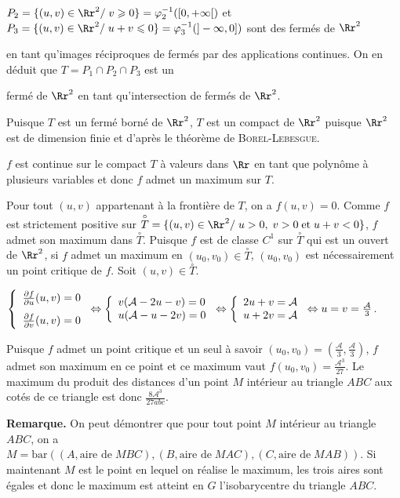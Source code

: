 {{$P_2=\{(u,v)\in\Rr^2/\;v\geqslant0\}=\varphi_2^{-1}([0,+\infty[)$ et $P_3=\{(u,v)\in\Rr^2/\;u+v\leqslant0\}=\varphi_3^{-1}(]-\infty,0])$ sont des fermés de $\Rr^2$

en tant qu'images réciproques de fermés par des applications continues. On en déduit que $T=P_1\cap P_2\cap P_3$ est un

fermé de $\Rr^2$ en tant qu'intersection de fermés de $\Rr^2$.

Puisque $T$ est un fermé borné de $\Rr^2$, $T$ est un compact de $\Rr^2$ puisque $\Rr^2$ est de dimension finie et d'après le théorème de \textsc{Borel}-\textsc{Lebesgue}.

$f$ est continue sur le compact $T$ à valeurs dans $\Rr$ en tant que polynôme à plusieurs variables et donc $f$ admet un maximum sur $T$.

Pour tout $(u,v)$ appartenant à la frontière de $T$, on a $f(u,v)=0$. Comme $f$ est strictement positive sur $\overset{\circ}{T}=\{(u,v)\in\Rr^2/\;u>0,\;v>0\;\text{et}\;u+v<0\}$, $f$ admet son maximum dans $\overset{\circ}{T}$. Puisque $f$ est de classe $C^1$ sur $\overset{\circ}{T}$ qui est un ouvert de $\Rr^2$, si $f$ admet un maximum en $(u_0,v_0)\in\overset{\circ}{T}$, $(u_0,v_0)$ est nécessairement un point critique de $f$. Soit $(u,v)\in\overset{\circ}{T}$.

\begin{center}
$\left\{
\begin{array}{l}
 \frac{\partial f}{\partial u}(u,v)=0\\
\rule{0mm}{6mm} \frac{\partial f}{\partial v}(u,v)=0
\end{array}
\right.\Leftrightarrow\left\{
\begin{array}{l}
v(\mathcal{A}-2u-v)=0\\
u(\mathcal{A}-u-2v)=0
\end{array}
\right.\Leftrightarrow\left\{
\begin{array}{l}
2u+v=\mathcal{A}\\
u+2v=\mathcal{A}
\end{array}
\right.\Leftrightarrow u=v= \frac{\mathcal{A}}{3}$.
\end{center}

Puisque $f$ admet un point critique et un seul à savoir $(u_0,v_0)=\left( \frac{\mathcal{A}}{3}, \frac{\mathcal{A}}{3}\right)$, $f$ admet son maximum en ce point et ce maximum vaut $f(u_0,v_0)= \frac{\mathcal{A}^3}{27}$. Le maximum du produit des distances d'un point $M$ intérieur au triangle $ABC$ aux cotés de ce triangle est donc $ \frac{8\mathcal{A}^3}{27abc}$.

\textbf{Remarque.} On peut démontrer que pour tout point $M$ intérieur au triangle $ABC$, on a $M=\text{bar}\left((A,\text{aire de}\;MBC),(B,\text{aire de}\;MAC),(C,\text{aire de}\;MAB)\right)$. Si maintenant $M$ est le point en lequel on réalise le maximum, les trois aires sont égales et donc le maximum est atteint en $G$ l'isobarycentre du triangle $ABC$.
}
}
